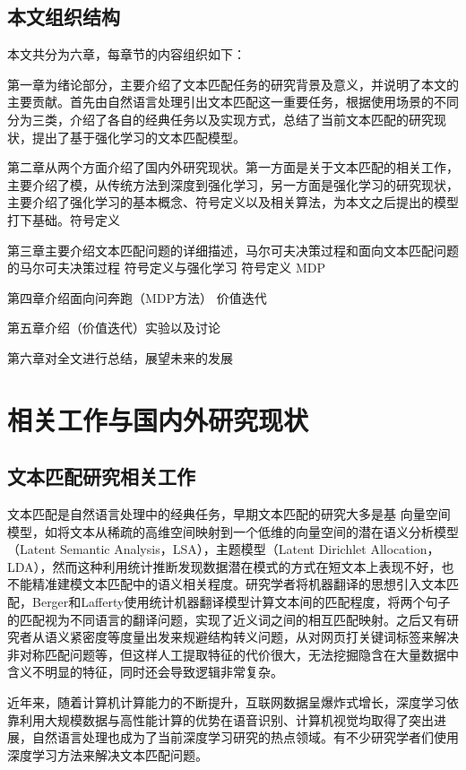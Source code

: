 \section{本文组织结构}
本文共分为六章，每章节的内容组织如下：

第一章为绪论部分，主要介绍了文本匹配任务的研究背景及意义，并说明了本文的主要贡献。首先由自然语言处理引出文本匹配这一重要任务，根据使用场景的不同分为三类，介绍了各自的经典任务以及实现方式，总结了当前文本匹配的研究现状，提出了基于强化学习的文本匹配模型。

第二章从两个方面介绍了国内外研究现状。第一方面是关于文本匹配的相关工作，主要介绍了模，从传统方法到深度到强化学习，另一方面是强化学习的研究现状，主要介绍了强化学习的基本概念、符号定义以及相关算法，为本文之后提出的模型打下基础。符号定义

第三章主要介绍文本匹配问题的详细描述，马尔可夫决策过程和面向文本匹配问题的马尔可夫决策过程
 符号定义与强化学习 符号定义 MDP

第四章介绍面向问奔跑（MDP方法） 价值迭代

第五章介绍（价值迭代）实验以及讨论

第六章对全文进行总结，展望未来的发展



\chapter{相关工作与国内外研究现状}

\section{文本匹配研究相关工作}
\label{sec:text_matching}
文本匹配是自然语言处理中的经典任务，早期文本匹配的研究大多是基 向量空间模型，如将文本从稀疏的高维空间映射到一个低维的向量空间的潜在语义分析模型\cite{Landauer1998AnIT}（Latent Semantic Analysis，LSA），主题模型\cite{Blei2003LatentDA}（Latent Dirichlet Allocation，LDA），然而这种利用统计推断发现数据潜在模式的方式在短文本上表现不好，也不能精准建模文本匹配中的语义相关程度。研究学者将机器翻译的思想引入文本匹配，Berger和Lafferty使用统计机器翻译模型计算文本间的匹配程度，将两个句子的匹配视为不同语言的翻译问题，实现了近义词之间的相互匹配映射。之后又有研究者从语义紧密度等度量出发来规避结构转义问题，从对网页打关键词标签来解决非对称匹配问题等，但这样人工提取特征的代价很大，无法挖掘隐含在大量数据中含义不明显的特征，同时还会导致逻辑非常复杂。

近年来，随着计算机计算能力的不断提升，互联网数据呈爆炸式增长，深度学习依靠利用大规模数据与高性能计算的优势在语音识别、计算机视觉均取得了突出进展，自然语言处理也成为了当前深度学习研究的热点领域。有不少研究学者们使用深度学习方法来解决文本匹配问题。

